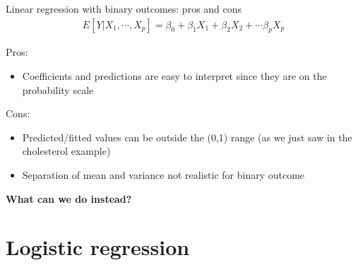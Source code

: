 \documentclass[10pt,t]{beamer}
\begin{document}
\begin{frame}{Linear regression with binary outcomes: pros and cons}
	\begin{align*} 
		E[Y|X_1,\cdots,X_p] = \beta_0 + \beta_1 X_1 + \beta_2 X_2 + \cdots \beta_p X_p 
	\end{align*}
	
	Pros: 
	\begin{itemize}
		\item Coefficients and predictions are easy to interpret since they are on the probability scale
	\end{itemize}
	
	Cons: 
	\begin{itemize}
		\item Predicted/fitted values can be outside the (0,1) range (as we just saw in the cholesterol example)
		\item Separation of mean and variance not realistic for binary outcome
	\end{itemize}
	
	\textbf{What can we do instead?}
\end{frame}


\section{Logistic regression}
\end{document}
